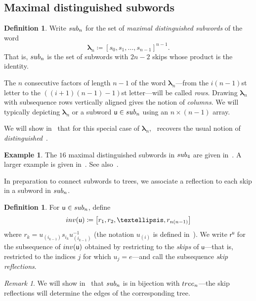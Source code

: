 \documentclass[a4paper,10pt,leqno]{amsart}
\newcommand{\darkred}{\color{darkred}}
\numberwithin{equation}{section}
\theoremstyle{definition}
\newtheorem{definition}[theorem]{Definition}
\newtheorem{example}[theorem]{Example}
\theoremstyle{remark}
\newtheorem{remark}[theorem]{Remark}
\renewcommand{\u}{\mathsf{u}}
\newcommand{\T}{\textsc{tree}}
\renewcommand{\S}{\textsc{sub}}
\newcommand{\E}{\T}
\newcommand{\Inv}{\textsc{inv}}
\newcommand{\rr}{\mathsf{r}}
\newcommand{\rru}{\rr^\u}
\newcommand{\blambda}{\bm{\lambda}}
\newcommand{\defn}[1]{\emph{\darkred #1}}
\begin{document}
\subsection{Maximal distinguished subwords}

\begin{definition}
\label{def:subwords}
Write $\S_n$ for the set of \defn{maximal distinguished subwords} of the word \[\blambda_n\coloneqq[s_0,s_1,\ldots,s_{n-1}]^{n-1}.\] That is, $\S_n$ is the set of subwords with $2n-2$ skips whose product is the identity.
\end{definition}
  The $n$ consecutive factors of length $n-1$ of the word $\blambda_n$---from the $i(n-1)$st letter to the $((i+1)(n-1)-1)$st letter---will be called \defn{rows}.  Drawing $\blambda_n$ with subsequence rows vertically aligned gives the notion of \defn{columns}.  We will typically depicting $\blambda_n$ or a subword $\u \in \S_n$ using an $n \times (n-1)$ array.

We will show in~ that for this special case of $\blambda_n$,~ recovers the usual notion of \emph{distinguished}~\cite{deodhar1985some}.

\begin{example}
The $16$ maximal distinguished subwords in $\S_4$ are given in~.  A larger example is given in~.  See also~.
\end{example}

In preparation to connect subwords to trees, we associate a reflection to each skip in a subword in $\S_n$.

\begin{definition}\label{def:inv}
For $\u \in \S_n$, define \begin{equation}\label{eq:inv}\Inv(\u) \coloneqq \big[r_1,r_2,\ldots,r_{n(n-1)}\big]\end{equation}
where $r_k=u_{(i_{k-1})}s_{i_k}u_{(i_{k-1})}^{-1}$ (the notation $u_{(i)}$ is defined in~).  We write $\rru$ for the subsequence of $\Inv(\u)$ obtained by restricting to the \emph{skips} of $\u$---that is, restricted to the indices $j$ for which $u_j = e$---and call the subsequence \defn{skip reflections}.
\end{definition}


\begin{remark}
We will show in~ that $\S_n$ is in bijection with $\E_n$---the skip reflections will determine the edges of the corresponding tree.
\end{remark}
\end{document}

